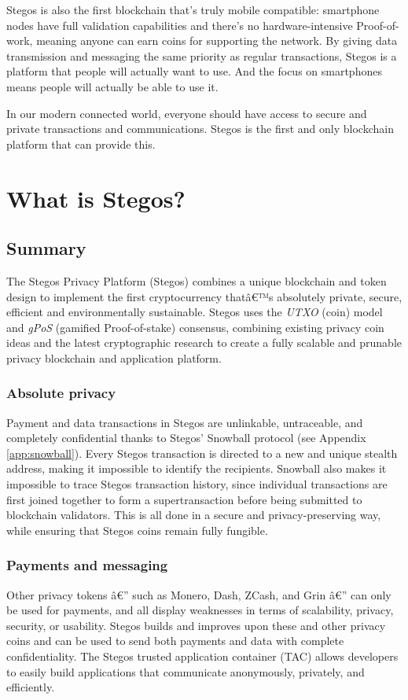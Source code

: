 \documentclass[8pt,fleqn,openany]{book}
\begin{document}
Stegos is also the first blockchain that's truly mobile compatible: smartphone nodes have full validation capabilities and there's no hardware-intensive Proof-of-work, meaning anyone can earn coins for supporting the network. By giving data transmission and messaging the same priority as regular transactions, Stegos is a platform that people will actually want to use. And the focus on smartphones means people will actually be able to use it.

In our modern connected world, everyone should have access to secure and private transactions and communications. Stegos is the first and only blockchain platform that can provide this.  

	\chapter{What is Stegos?}\label{chap:what-is-stegos}
	
	\section{Summary}
	The Stegos Privacy Platform (Stegos) combines a unique blockchain and token design to implement the first cryptocurrency thatâ€™s absolutely private, secure, efficient and environmentally sustainable. Stegos uses the \textit{UTXO} (coin) model and \textit{gPoS} (gamified Proof-of-stake) consensus, combining existing privacy coin ideas and the latest cryptographic research to create a fully scalable and prunable privacy blockchain and application platform. 
	
	\subsection{Absolute privacy}
	Payment and data transactions in Stegos are unlinkable, untraceable, and completely confidential thanks to Stegos' Snowball protocol (see Appendix \ref{app:snowball}). Every Stegos transaction is directed to a new and unique stealth address, making it impossible to identify the recipients. Snowball also makes it impossible to trace Stegos transaction history, since individual transactions are first joined together to form a supertransaction before being submitted to blockchain validators. This is all done in a secure and privacy-preserving way, while ensuring that Stegos coins remain fully fungible.
	
	\subsection{Payments and messaging}
	Other privacy tokens â€” such as Monero, Dash, ZCash, and Grin â€” can only be used for payments, and all display weaknesses in terms of scalability, privacy, security, or usability. Stegos builds and improves upon these and other privacy coins and can be used to send both payments and data with complete confidentiality. The Stegos trusted application container (TAC) allows developers to easily build applications that communicate anonymously, privately, and efficiently.
	
\end{document}
